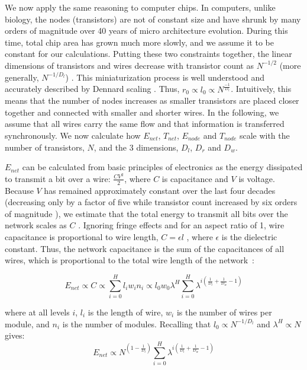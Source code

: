 \documentclass[12pt]{article}
\begin{document}
We now apply the same reasoning to computer chips. 
In computers, unlike biology, the nodes (transistors) 
are not of constant size and have shrunk by many orders of magnitude over 40
years of micro architecture evolution.  During this time, total chip area has grown
much more slowly, and we assume it to be constant for our calculations.
Putting these two constraints together, the linear dimensions of transistors
and wires decrease with transistor count as $N^{-1/2}$ (more generally,
$N^{-1/D_l}$) \cite{moses08}.  This miniaturization process is well understood
and accurately described by Dennard scaling \cite{dennard74}.  
Thus, $r_0 \propto l_0 \propto N^{\frac{-1}{D_l}}$. Intuitively, this means
that the number of nodes increases as smaller transistors are placed closer
together and connected with smaller and shorter wires. In the following,
we assume that all wires carry the same flow and that information is
transferred synchronously. We now calculate how $E_{net}$, $T_{net}$,
$E_{node}$ and $T_{node}$ scale with the number of transistors, $N$, and the 3
dimensions, $D_l$, $D_r$ and $D_w$.

$E_{net}$ can be calculated from basic principles of electronics as the energy
dissipated to transmit a bit over a wire: $\frac{CV^2}{2}$, where $C$ is
capacitance and $V$ is voltage.  Because $V$ has remained approximately
constant over the last four decades (decreasing only by a factor of five while
transistor count increased by six orders of magnitude \cite{ning07}), we
estimate that the total energy to transmit all bits over the network scales as
$C$ \cite{bingham08}.  Ignoring fringe effects and for an aspect ratio of 1,
wire capacitance is proportional to wire length, $C = \epsilon l$
\cite{wilhelm95}, where $\epsilon$ is the dielectric constant. Thus, the
network capacitance is the sum of the capacitances of all wires, which is
proportional to the total wire length of the network~\cite{donath79}:

\begin{equation}
  \label{eq:ChipsEnet}
  E_{net} \propto C \propto  \sum_{i=0}^H l_i w_i n_i \propto l_0 w_0 \lambda^H
\sum_{i=0}^H \lambda^{i \left( \frac{1}{D_l} + \frac{1}{D_w} -1 \right)}
\end{equation}

\noindent where at all levels $i$, $l_i$ is the length of wire, $w_i$ is the number of wires per
module, and $n_i$ is the number of modules. Recalling that
$l_0 \propto N^{-1/D_l}$ and $\lambda^H \propto N$ gives: 
\begin{equation}
\label{eq:comp-Enet}
  E_{net}  \propto  N^{(1- \frac{1}{D_l})} \sum_{i=0}^H \lambda^{i \left( 
\frac{1}{D_l} + \frac{1}{D_w} -1 \right)}
\end{equation}
\end{document}
